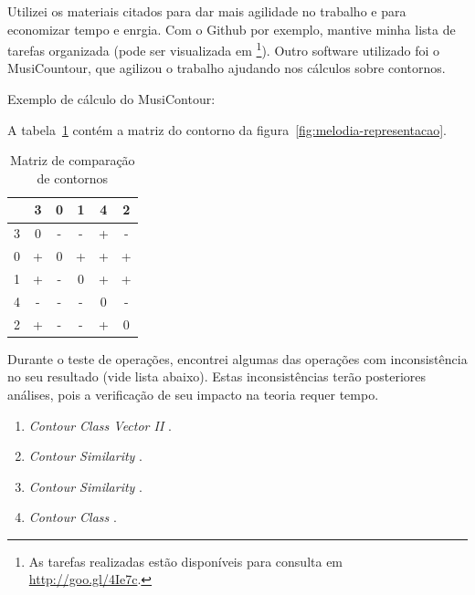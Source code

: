 \documentclass[11pt]{article}
\newcommand{\eng}[1]{\textit{#1}}
\begin{document}
Utilizei os materiais citados para dar mais agilidade no trabalho e para
economizar tempo e enrgia. Com o Github por exemplo, mantive minha lista
de tarefas organizada
(pode ser visualizada em \footnote{As
  tarefas realizadas estão disponíveis para consulta em
  \url{http://goo.gl/4Ie7c}.}).
Outro software utilizado foi o MusiCountour,
  que agilizou o trabalho ajudando nos cálculos sobre contornos.

Exemplo de cálculo do MusiContour:

A tabela~\ref{tab:matriz-comparacao-contornos} contém a matriz do
contorno da figura~\ref{fig:melodia-representacao}.

\begin{table}
  \centering
  \begin{tabular}{c|ccccc}
    &3&0&1&4&2\\
    \hline
    3&0&-&-&+&-\\
    0&+&0&+&+&+\\
    1&+&-&0&+&+\\
    4&-&-&-&0&-\\
    2&+&-&-&+&0\\
  \end{tabular}
  \caption{Matriz de comparação de contornos}
  \label{tab:matriz-comparacao-contornos}
\end{table}


Durante o teste de operações, encontrei algumas das operações com
inconsistência no seu resultado (vide lista abaixo). Estas inconsistências terão posteriores
análises, pois a verificação de seu impacto na teoria requer tempo.


\begin{enumerate}
\item \eng{Contour Class Vector II} \cite[p. 241]{Friedmann1985}.
\item \eng{Contour Similarity} \cite[p. 242]{Quinn1997}.
\item \eng{Contour Similarity} \cite[p. 262]{Quinn1997}.
\item \eng{Contour Class} \cite[p. 113]{Schultz2008}.
\end{enumerate}
\end{document}
